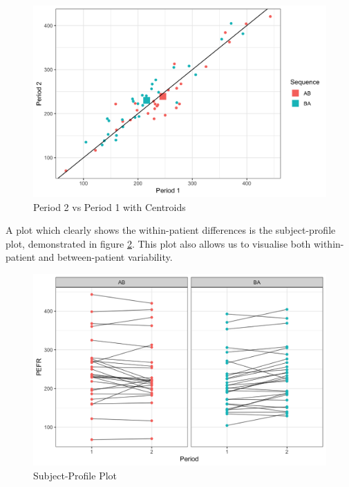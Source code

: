 \documentclass[12pt, TexShade, letterpaper]{report}
\begin{document}
\begin{figure}[ht]
    \centering
    \includegraphics[width=0.85\linewidth]{report/figures/centroidsPlot.png}
    \caption{Period 2 vs Period 1 with Centroids}
    \label{fig:centroids}
\end{figure}

A plot which clearly shows the within-patient differences is the subject-profile plot, demonstrated in figure \ref{fig:subjectprofile}. This plot also allows us to visualise both within-patient and between-patient variability.

\begin{figure}[ht]
    \centering
    \includegraphics[width=0.85\linewidth]{report/figures/subjectProfilesPlot.png}
    \caption{Subject-Profile Plot}
    \label{fig:subjectprofile}
\end{figure}
\end{document}
